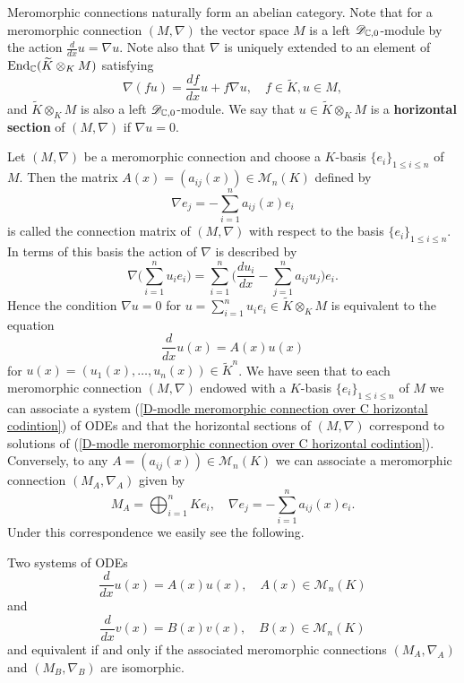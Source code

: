 Meromorphic connections naturally form an abelian category. Note that for a meromorphic connection $(M,\nabla)$ the vector space $M$ is a left $\mathscr{D}_{\mathbb{C},0}$-module by the action $\frac{d}{dx}u=\nabla u$. Note also that $\nabla$ is uniquely extended to an element of $\mathrm{End}_{\mathbb{C}}(\widetilde{K}\otimes_KM)$ satisfying
\[\nabla(fu)=\frac{df}{dx}u+f\nabla u,\quad f\in\widetilde{K},u\in M,\]
and $\widetilde{K}\otimes_KM$ is also a left $\mathscr{D}_{\mathbb{C},0}$-module. We say that $u\in\widetilde{K}\otimes_KM$ is a \textbf{horizontal section} of $(M,\nabla)$ if $\nabla u=0$.\par
Let $(M,\nabla)$ be a meromorphic connection and choose a $K$-basis $\{e_i\}_{1\leq i\leq n}$ of $M$. Then the matrix $A(x)=(a_{ij}(x))\in\mathcal{M}_n(K)$ defined by
\begin{equation}\label{D-modle meromorphic connection over C connection matrix}
\nabla e_j=-\sum_{i=1}^{n}a_{ij}(x)e_i
\end{equation}
is called the connection matrix of $(M,\nabla)$ with respect to the basis $\{e_i\}_{1\leq i\leq n}$. In terms of this basis the action of $\nabla$ is described by
\[\nabla\Big(\sum_{i=1}^{n}u_ie_i\Big)=\sum_{i=1}^{n}\Big(\frac{du_i}{dx}-\sum_{j=1}^{n}a_{ij}u_j\Big)e_i.\]
Hence the condition $\nabla u=0$ for $u=\sum_{i=1}^{n}u_ie_i\in\widetilde{K}\otimes_KM$ is equivalent to the equation
\begin{equation}\label{D-modle meromorphic connection over C horizontal codintion}
\frac{d}{dx}u(x)=A(x)u(x)
\end{equation}
for $u(x)=(u_1(x),\dots,u_n(x))\in\widetilde{K}^n$. We have seen that to each meromorphic connection $(M,\nabla)$ endowed with a $K$-basis $\{e_i\}_{1\leq i\leq n}$ of $M$ we can associate a system (\ref{D-modle meromorphic connection over C horizontal codintion}) of ODEs and that the horizontal sections of $(M,\nabla)$ correspond to solutions of (\ref{D-modle meromorphic connection over C horizontal codintion}). Conversely, to any $A=(a_{ij}(x))\in\mathcal{M}_n(K)$ we can associate a meromorphic connection $(M_A,\nabla_A)$ given by 
\[M_A=\bigoplus_{i=1}^{n}Ke_i,\quad \nabla e_j=-\sum_{i=1}^{n}a_{ij}(x)e_i.\]
Under this correspondence we easily see the following.

\begin{lemma}\label{D-modle meromorphic connection over C isomorphic iff}
Two systems of ODEs
\[\frac{d}{dx}u(x)=A(x)u(x),\quad A(x)\in\mathcal{M}_n(K)\]
and 
\[\frac{d}{dx}v(x)=B(x)v(x),\quad B(x)\in\mathcal{M}_n(K)\]
and equivalent if and only if the associated meromorphic connections $(M_A,\nabla_A)$ and $(M_B,\nabla_B)$ are isomorphic.
\end{lemma}

